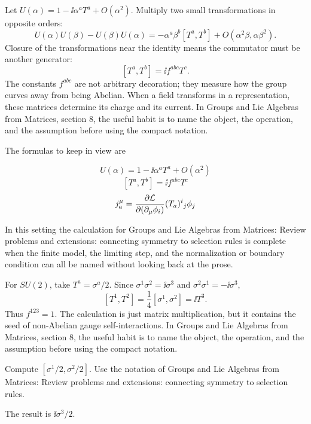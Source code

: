 Let \(U(\alpha)=1-\ii\alpha^aT^a+O(\alpha^2)\).  Multiply two small transformations in opposite orders:
\[
  U(\alpha)U(\beta)-U(\beta)U(\alpha)
  =
  -\alpha^a\beta^b[T^a,T^b]+O(\alpha^2\beta,\alpha\beta^2).
\]
Closure of the transformations near the identity means the commutator must be another generator:
\[
  [T^a,T^b]=\ii f^{abc}T^c.
\]
The constants \(f^{abc}\) are not arbitrary decoration; they measure how the group curves away from being Abelian.  When a field transforms in a representation, these matrices determine its charge and its current.  In Groups and Lie Algebras from Matrices, section 8, the useful habit is to name the object, the operation, and the assumption before using the compact notation.

The formulas to keep in view are

\[
  U(\alpha)=1-\ii\alpha^aT^a+O(\alpha^2)
\]
\[
  [T^a,T^b]=\ii f^{abc}T^c
\]
\[
  j^\mu_a=\frac{\partial\mathcal L}{\partial(\partial_\mu\phi_i)}(T_a)^i{}_j\phi_j
\]

In this setting the calculation for Groups and Lie Algebras from Matrices: Review problems and extensions: connecting symmetry to selection rules is complete when the finite model, the limiting step, and the normalization or boundary condition can all be named without looking back at the prose.




\begin{example}
For \(SU(2)\), take \(T^a=\sigma^a/2\).  Since \(\sigma^1\sigma^2=\ii\sigma^3\) and \(\sigma^2\sigma^1=-\ii\sigma^3\),
\[
  [T^1,T^2]=\frac14[\sigma^1,\sigma^2]=\ii T^3.
\]
Thus \(f^{123}=1\).  The calculation is just matrix multiplication, but it contains the seed of non-Abelian gauge self-interactions.  In Groups and Lie Algebras from Matrices, section 8, the useful habit is to name the object, the operation, and the assumption before using the compact notation.
\end{example}



\begin{exercise}
Compute \([\sigma^1/2,\sigma^2/2]\).  Use the notation of Groups and Lie Algebras from Matrices: Review problems and extensions: connecting symmetry to selection rules.
\begin{answer}
The result is \(\ii\sigma^3/2\).
\end{answer}
\end{exercise}

